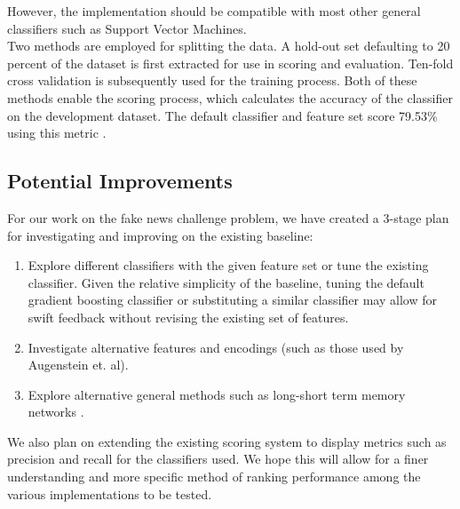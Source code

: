 \documentclass[11pt,a4paper]{article}
\begin{document}
However, the implementation should be compatible with most other general classifiers such as Support Vector Machines.  \\

Two methods are employed for splitting the data. A hold-out set defaulting to 20 percent of the dataset is first extracted for use in scoring and evaluation. Ten-fold cross validation is subsequently used for the training process. Both of these methods enable the scoring process, which calculates the accuracy of the classifier on the development dataset. The default classifier and feature set score 79.53\% using this metric \cite{fncbaselinegithub}.


\subsection{Potential Improvements} 

For our work on the fake news challenge problem, we have created a 3-stage plan for investigating and improving on the existing baseline:

\begin{enumerate}
	\item Explore different classifiers with the given feature set or tune the existing classifier. Given the relative simplicity of the baseline, tuning the default gradient boosting classifier or substituting a similar classifier may allow for swift feedback without revising the existing set of features.
	\item Investigate alternative features and encodings (such as those used by Augenstein et. al). 
	\item Explore alternative general methods such as long-short term memory networks \cite{augenstein2016stance}. 
\end{enumerate}

We also plan on extending the existing scoring system to display metrics such as precision and recall for the classifiers used. We hope this will allow for a finer understanding and more specific method of ranking performance among the various implementations to be tested.





%
%


\end{document}
